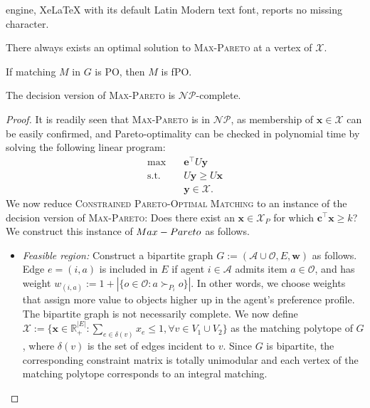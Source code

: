 \documentclass[10pt,a4paper]{amsart}
\newcommand{\mc}{\mathcal}
\begin{document}
engine, XeLaTeX with its default Latin Modern text font, reports no missing character.
\begin{lem}
\label{lem:opt_vertex}
There always exists an optimal solution to \textsc{Max-Pareto} at a vertex of $\mc{X}$. 
\end{lem}

\begin{thm}
If matching $M$ in $G$ is PO, then $M$ is fPO. 
\label{thm:fpo_matching}
\end{thm}

\begin{thm}
The decision version of \textsc{Max-Pareto} is $\mc{NP}$-complete.
\end{thm}

\begin{proof}
It is readily seen that \textsc{Max-Pareto} is in $\mc{NP}$, as membership of $\bm{x} \in \mathcal{X}$ can be easily confirmed, and Pareto-optimality can be checked in polynomial time by solving the following linear program:
\begin{subequations}
\begin{align}
\max \quad & \bm{e}^\top U \bm{y} \\
\text{s.t.} \quad & U \bm{y} \geq U \bm{x} \\ 
& \bm{y} \in \mc{X}.  
\end{align}
\end{subequations}
We now reduce \textsc{Constrained Pareto-Optimal Matching} to an instance of the decision version of \textsc{Max-Pareto}: Does there exist an $\bm{x} \in \mc{X}_{P}$ for which $\bm{c}^\top \bm{x} \geq k$? We construct this instance of $\textsc{Max-Pareto}$ as follows.
\begin{itemize}
    \item \textit{Feasible region:} Construct a bipartite graph $G := (\mc{A} \cup \mc{O}, E, \bm{w})$ as follows. Edge $e = (i, a)$ is included in $E$ if agent $i \in \mc{A}$ admits item $a \in \mc{O}$, and has weight $w_{(i, a)} := 1 + | \{ o \in \mc{O} : a \succ_{P_i} o\} |$. In other words, we choose weights that assign more value to objects higher up in the agent's preference profile. The bipartite graph is not necessarily complete. We now define $\mc{X} := \{ \bm{x} \in \mathbb{R}^{|E|}_{+} : \sum\limits_{e \in \delta(v)} x_e \leq 1, \forall v \in V_1 \cup V_2\}$ as the matching polytope of $G$, where $\delta(v)$ is the set of edges incident to $v$. Since $G$ is bipartite, the corresponding constraint matrix is totally unimodular and each vertex of the matching polytope corresponds to an integral matching.

\end{itemize}
\end{proof}
\end{document}
